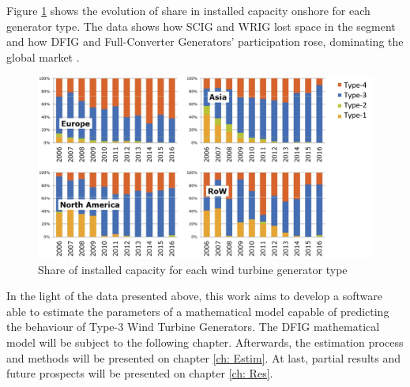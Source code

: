 Figure \ref{fig: WindShare} shows the evolution of share in installed capacity onshore for each generator type. The data shows how SCIG and WRIG lost space in the segment and how DFIG and Full-Converter Generators' participation rose, dominating the global market \cite{Magagna2017}.

\begin{figure}[h]
	\caption{Share of installed capacity for each wind turbine generator type}
	\begin{center}
		\includegraphics[scale=.2]{Images/WTGTypes.jpg}
	\end{center}
	\label{fig: WindShare}
\end{figure}

In the light of the data presented above, this work aims to develop a software able to estimate the parameters of a mathematical model capable of predicting the behaviour of Type-3 Wind Turbine Generators. The DFIG mathematical model will be subject to the following chapter. Afterwards, the estimation process and methods will be presented on chapter \ref{ch: Estim}. At last, partial results and future prospects will be presented on chapter \ref{ch: Res}.
